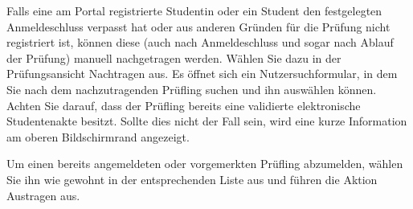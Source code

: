 \documentclass[a4paper,11pt]{article}
\newcommand{\knopf}[1]{{\sc #1}}
\begin{document}
Falls eine am Portal registrierte Studentin oder ein Student den festgelegten Anmeldeschluss
verpasst hat oder aus anderen Gründen für die Prüfung nicht registriert ist,
können diese (auch nach Anmeldeschluss und sogar nach Ablauf der Prüfung)
manuell nachgetragen werden. Wählen Sie dazu in der Prüfungsansicht \knopf{Nachtragen}
aus. Es öffnet sich ein Nutzersuchformular, in dem Sie nach dem
nachzutragenden Prüfling suchen und ihn auswählen können. Achten Sie darauf,
dass der Prüfling bereits eine validierte elektronische Studentenakte
besitzt. Sollte dies nicht der Fall sein, wird eine kurze Information am
oberen Bildschirmrand angezeigt.

Um einen bereits angemeldeten oder vorgemerkten Prüfling abzumelden, wählen
Sie ihn wie gewohnt in der entsprechenden Liste aus und führen die Aktion
\knopf{Austragen} aus.
\end{document}
